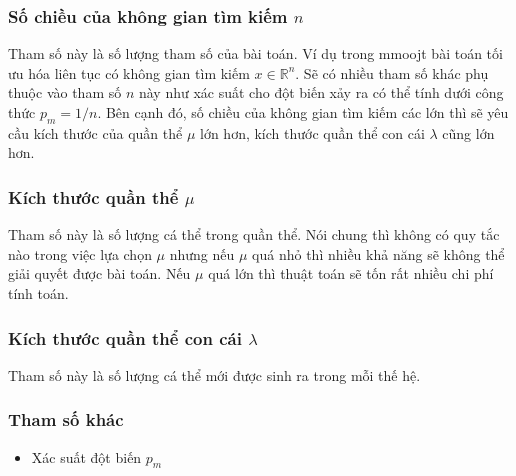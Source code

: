 
\subsubsection{Số chiều của không gian tìm kiếm $n$} Tham số này là số lượng tham số của bài toán. Ví dụ trong mmoojt bài toán tối ưu hóa liên tục có không gian tìm kiếm $x \in \mathbb{R}^n$. Sẽ có nhiều tham số khác phụ thuộc vào tham số $n$ này như xác suất cho đột biến xảy ra có thể tính dưới công thức $p_m=1/n$. Bên cạnh đó, số chiều của không gian tìm kiếm các lớn thì sẽ yêu cầu kích thước của quần thể $\mu$ lớn hơn, kích thước quần thể con cái $\lambda$ cũng lớn hơn.
    
\subsubsection{Kích thước quần thể $\mu$} Tham số này là số lượng cá thể trong quần thể. Nói chung thì không có quy tắc nào trong việc lựa chọn $\mu$ nhưng nếu $\mu$ quá nhỏ thì nhiều khả năng sẽ không thể giải quyết được bài toán. Nếu $\mu$ quá lớn thì thuật toán sẽ tốn rất nhiều chi phí tính toán.

\subsubsection{Kích thước quần thể con cái $\lambda$} Tham số này là số lượng cá thể mới được sinh ra trong mỗi thế hệ. 

\subsubsection{Tham số khác}
    \begin{itemize}
        \item Xác suất đột biến $p_m$
    \end{itemize}